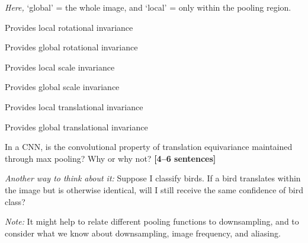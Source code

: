 \documentclass{csci1430}
\begin{document}
\emph{Here,} `global' = the whole image, and `local' = only within the pooling region.

\begin{answerlist}
    \item Provides local rotational invariance
    \item Provides global rotational invariance
    \item Provides local scale invariance 
    \item Provides global scale invariance
    \item Provides local translational invariance 
    \item Provides global translational invariance
\end{answerlist}

\begin{subquestion}[points=2]
In a CNN, is the convolutional property of translation equivariance maintained through max pooling? Why or why not? \textbf{[4--6 sentences]}
\end{subquestion}

\vspace{0.5em}
\emph{Another way to think about it:} Suppose I classify birds. If a bird translates within the image but is otherwise identical, will I still receive the same confidence of bird class?

\vspace{0.5em}
\emph{Note:} It might help to relate different pooling functions to downsampling, and to consider what we know about downsampling, image frequency, and aliasing.


\begin{answer}[height=12]

\end{answer}


\pagebreak
\end{document}
